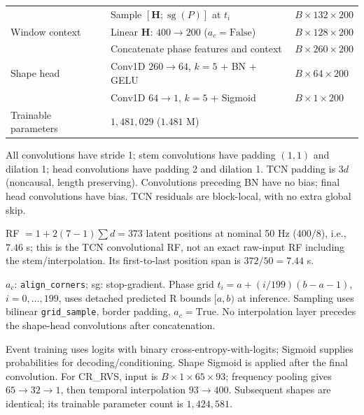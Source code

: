 \begin{table}[!t]
\begin{threeparttable}
\begin{tabular}{@{}lll@{}}
 & Sample $[\mathbf H;\operatorname{sg}(P)]$ at $t_i$ & $B\times132\times200$ \\
Window context & Linear $\mathbf H$: $400\to200$ ($a_c=\mathrm{False}$) & $B\times128\times200$ \\
 & Concatenate phase features and context & $B\times260\times200$ \\
\addlinespace[2pt]
Shape head & Conv1D $260\to64$, $k=5$ + BN + GELU & $B\times64\times200$ \\
 & Conv1D $64\to1$, $k=5$ + Sigmoid & $B\times1\times200$ \\
\midrule
Trainable parameters & \multicolumn{2}{l}{$1{,}481{,}029$ ($1.481$ M)} \\
\bottomrule
\end{tabular}
\begin{tablenotes}[flushleft]\scriptsize
\item All convolutions have stride 1; stem convolutions have padding $(1,1)$ and dilation 1; head convolutions have padding 2 and dilation 1. TCN padding is $3d$ (noncausal, length preserving). Convolutions preceding BN have no bias; final head convolutions have bias. TCN residuals are block-local, with no extra global skip.
\item RF $=1+2(7-1)\sum d=373$ latent positions at nominal 50 Hz ($400/8$), i.e., $7.46$ s; this is the TCN convolutional RF, not an exact raw-input RF including the stem/interpolation. Its first-to-last position span is $372/50=7.44$ s.
\item $a_c$: \texttt{align\_corners}; sg: stop-gradient. Phase grid $t_i=a+(i/199)(b-a-1)$, $i=0,\ldots,199$, uses detached predicted R bounds $[a,b)$ at inference. Sampling uses bilinear \texttt{grid\_sample}, border padding, $a_c=\mathrm{True}$. No interpolation layer precedes the shape-head convolutions after concatenation.
\item Event training uses logits with binary cross-entropy-with-logits; Sigmoid supplies probabilities for decoding/conditioning. Shape Sigmoid is applied after the final convolution. For CR\_RVS, input is $B\times1\times65\times93$; frequency pooling gives $65\to32\to1$, then temporal interpolation $93\to400$. Subsequent shapes are identical; its trainable parameter count is $1{,}424{,}581$.
\end{tablenotes}
\end{threeparttable}
\end{table}
